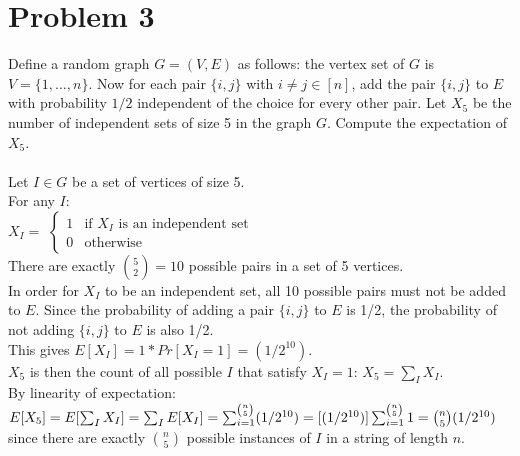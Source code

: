 \documentclass[10pt,letterpaper]{article}
\newcommand\tab[1][0.5cm]{\hspace*{#1}}
\begin{document}
\pagebreak


\section{Problem 3}
Define a random graph $G=(V,E)$ as follows: the vertex set of $G$ is $V=\{1,\dots,n\}$. Now for each pair $\{i,j\}$ with $i \neq j \in [n]$, add the pair $\{i,j\}$ to $E$ with probability $1/2$ independent of the choice for every other pair. Let $X_5$ be the number of independent sets of size 5 in the graph $G$. Compute the expectation of $X_5$.\\\\
Let $I \in G$ be a set of vertices of size 5.\\
For any $I$:\\
\tab $X_I=$
$\begin{cases}
1 & \text{if $X_I$ is an independent set}\\
0 & \text{otherwise}
\end{cases}$\\
There are exactly $\binom{5}{2}=10$ possible pairs in a set of 5 vertices.\\
In order for $X_I$ to be an independent set, all 10 possible pairs must not be added to $E$. Since the probability of adding a pair $\{i,j\}$ to $E$ is 1/2, the probability of not adding $\{i,j\}$ to $E$ is also 1/2.\\
This gives $E[X_I]=1*Pr[X_I=1]=(1/2^{10})$.\\
$X_5$ is then the count of all possible $I$ that satisfy $X_I=1$: $X_5=\sum_{I}X_I$.\\
By linearity of expectation: $E[X_5]=E[\sum_{I}X_I]=\sum_{I}E[X_I]\\
=\sum_{i=1}^{\binom{n}{5}}(1/2^{10})\\
=[(1/2^{10})]\sum_{i=1}^{\binom{n}{5}}1\\
=\binom{n}{5}(1/2^{10})$ since there are exactly $\binom{n}{5}$ possible instances of $I$ in a string of length $n$.\\

\pagebreak

\end{document}
